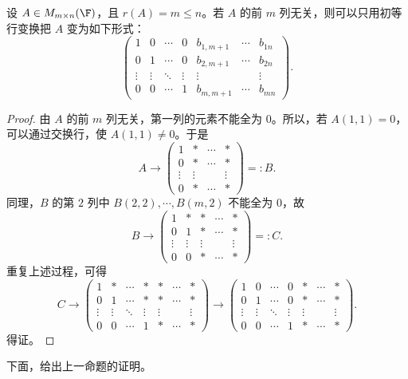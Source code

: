 \begin{lemma}
	设 $A\in M_{m\times n}(\F)$，且 $r(A)=m\leq n$。若 $A$ 的前 $m$ 列无关，则可以只用初等行变换把 $A$ 变为如下形式：
	\[
	\begin{pmatrix}
		1&0&\cdots&0&b_{1,m+1}&\cdots&b_{1n}\\
		0&1&\cdots&0&b_{2,m+1}&\cdots&b_{2n}\\
		\vdots&\vdots&\ddots&\vdots&\vdots&&\vdots\\
		0&0&\cdots&1&b_{m,m+1}&\cdots&b_{mn}
	\end{pmatrix}.
	\]
\end{lemma}
\begin{proof}
	由 $A$ 的前 $m$ 列无关，第一列的元素不能全为 $0$。所以，若 $A(1,1)=0$，可以通过交换行，使 $A(1,1)\neq0$。于是
	\[
	A\longrightarrow
	\begin{pmatrix}
		1&*&\cdots&*\\
		0&*&\cdots&*\\
		\vdots&\vdots&&\vdots\\
		0&*&\cdots&*
	\end{pmatrix}
	=:B.
	\]
	同理，$B$ 的第 $2$ 列中 $B(2,2),\cdots,B(m,2)$ 不能全为 $0$，故
	\[
	B\longrightarrow
	\begin{pmatrix}
		1&*&*&\cdots&*\\
		0&1&*&\cdots&*\\
		\vdots&\vdots&\vdots&&\vdots\\
		0&0&*&\cdots&*
	\end{pmatrix}
	=:C.
	\]
	重复上述过程，可得
	\[
	C\longrightarrow
	\begin{pmatrix}
		1&*&\cdots&*&*&\cdots&*\\
		0&1&\cdots&*&*&\cdots&*\\
		\vdots&\vdots&\ddots&\vdots&\vdots&&\vdots\\
		0&0&\cdots&1&*&\cdots&*
	\end{pmatrix}
	\longrightarrow
	\begin{pmatrix}
		1&0&\cdots&0&*&\cdots&*\\
		0&1&\cdots&0&*&\cdots&*\\
		\vdots&\vdots&\ddots&\vdots&\vdots&&\vdots\\
		0&0&\cdots&1&*&\cdots&*
	\end{pmatrix}.
	\]
	得证。
\end{proof}

下面，给出上一命题的证明。

